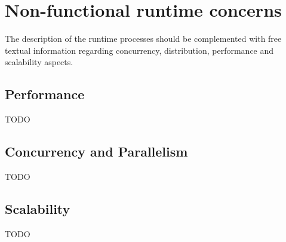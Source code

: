 \section{Non-functional runtime concerns}
The description of the runtime processes should be complemented with free
textual information regarding concurrency, distribution, performance and scalability aspects.


\subsection{Performance}
TODO



\subsection{Concurrency and Parallelism}
TODO




\subsection{Scalability}
TODO






